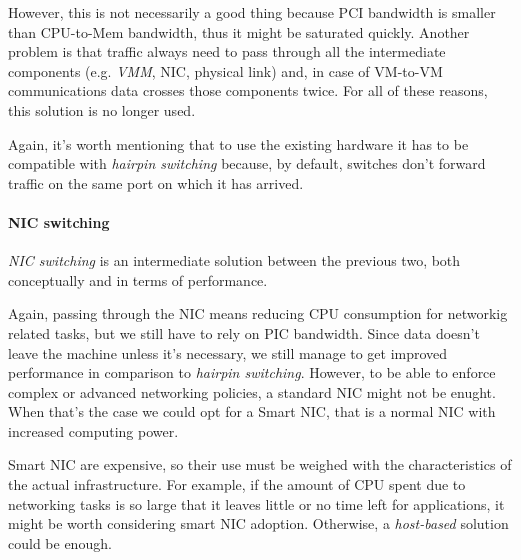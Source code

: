\bigskip\noindent
\begin{minipage}{0.48\textwidth}
    However, this is not necessarily a good thing because PCI bandwidth is
    smaller than CPU-to-Mem bandwidth, thus it might be saturated quickly. Another
    problem is that traffic always need to pass through all the intermediate
    components (e.g. \emph{VMM}, NIC, physical link) and, in case of VM-to-VM
    communications data crosses those components twice. For all of these reasons,
    this solution is no longer used.
\end{minipage}
\begin{minipage}{0.48\textwidth}
    \centering
\end{minipage}

\bigskip\noindent
Again, it's worth mentioning that to use the existing hardware it has to be
compatible with \emph{hairpin switching} because, by default, switches don't
forward traffic on the same port on which it has arrived.

\paragraph{NIC switching}
\emph{NIC switching} is an intermediate solution between the previous two, both
conceptually and in terms of performance.

\bigskip\noindent
\begin{minipage}{0.48\textwidth}
    Again, passing through the NIC means reducing CPU consumption for networkig
    related tasks, but we still have to rely on PIC bandwidth. Since data doesn't
    leave the machine unless it's necessary, we still manage to get improved
    performance in comparison to \emph{hairpin switching}. However, to be able
    to enforce complex or advanced networking policies, a standard NIC might not
    be enught. When that's the case we could opt for a Smart NIC, that is a
    normal NIC with increased computing power.
\end{minipage}
\hfill
\begin{minipage}{0.48\textwidth}
    \centering
\end{minipage}

\bigskip\noindent
Smart NIC are expensive, so their use must be weighed with the characteristics
of the actual infrastructure. For example, if the amount of CPU spent due to
networking tasks is so large that it leaves little or no time left for
applications, it might be worth considering smart NIC adoption. Otherwise, a
\emph{host-based} solution could be enough.

